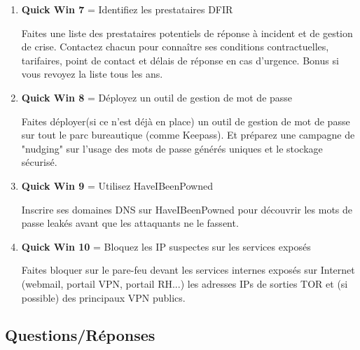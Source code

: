 \documentclass[a4paper]{article}
\begin{document}
\begin{enumerate}
\begin{example}
    \end{example}
    \item \textbf{Quick Win 7} = Identifiez les prestataires DFIR
    \begin{example}
        Faites une liste des prestataires potentiels de réponse à incident et de gestion de crise. Contactez chacun pour connaître ses conditions contractuelles, tarifaires, point de contact et délais de réponse en cas d'urgence. Bonus si vous revoyez la liste tous les ans.
    \end{example}
    \item \textbf{Quick Win 8} = Déployez un outil de gestion de mot de passe
    \begin{example}
        Faites déployer(si ce n'est déjà en place) un outil de gestion de mot de passe sur tout le parc bureautique (comme Keepass). Et préparez une campagne de "nudging" sur l'usage des mots de passe générés uniques et le stockage sécurisé.
    \end{example}
    \item \textbf{Quick Win 9} = Utilisez HaveIBeenPowned
    \begin{example}
        Inscrire ses domaines DNS sur HaveIBeenPowned pour découvrir les mots de passe leakés avant que les attaquants ne le fassent.
    \end{example}
    \item \textbf{Quick Win 10} = Bloquez les IP suspectes sur les services exposés
    \begin{example}
        Faites bloquer sur le pare-feu devant les services internes exposés sur Internet (webmail, portail VPN, portail RH...) les adresses IPs de sorties TOR et (si possible) des principaux VPN publics.
    \end{example}
\end{enumerate}










\subsection{Questions/Réponses}
\end{document}
